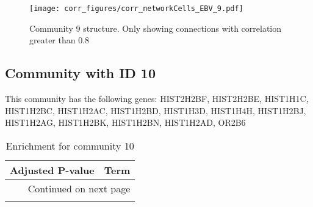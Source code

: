 \begin{figure}[h!]
\centering
\texttt{[image: corr\_figures/corr\_networkCells\_EBV\_9.pdf]}
\caption{Community 9 structure. Only showing connections with correlation greater than 0.8}
\end{figure}




\subsection*{Community with ID 10}
This community has the following genes: HIST2H2BF, HIST2H2BE, HIST1H1C, HIST1H2BC, HIST1H2AC, HIST1H2BD, HIST1H3D, HIST1H4H, HIST1H2BJ, HIST1H2AG, HIST1H2BK, HIST1H2BN, HIST1H2AD, OR2B6
\\
\begin{longtable}{p{2.4cm}p{14.5cm}}
\caption{Enrichment for community 10}\\
\toprule
Adjusted \newline P-value &                                                                                                                                  Term \\
\midrule
\endhead
\midrule
\multicolumn{2}{r}{{Continued on next page}} \\
\midrule
\endfoot


\end{longtable}

